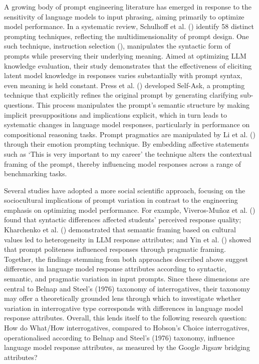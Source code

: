 \documentclass[
  12pt,
]{article}
\begin{document}
A growing body of prompt engineering literature has emerged in response to the sensitivity of language models to input phrasing, aiming primarily to optimize model performance. In a systematic review, Schulhoff et al. () identify 58 distinct prompting techniques, reflecting the multidimensionality of prompt design. One such technique, instruction selection (), manipulates the syntactic form of prompts while preserving their underlying meaning. Aimed at optimizing LLM knowledge evaluation, their study demonstrates that the effectiveness of eliciting latent model knowledge in responses varies substantially with prompt syntax, even meaning is held constant. Press et al. () developed Self-Ask, a prompting technique that explicitly refines the original prompt by generating clarifying sub-questions. This process manipulates the prompt's semantic structure by making implicit presuppositions and implications explicit, which in turn leads to systematic changes in language model responses, particularly in performance on compositional reasoning tasks. Prompt pragmatics are manipulated by Li et al. () through their emotion prompting technique. By embedding affective statements such as `This is very important to my career' the technique alters the contextual framing of the prompt, thereby influencing model responses across a range of benchmarking tasks.

Several studies have adopted a more social scientific approach, focusing on the sociocultural implications of prompt variation in contrast to the engineering emphasis on optimizing model performance. For example, Viveros-Muñoz et al. () found that syntactic differences affected students' perceived response quality; Kharchenko et al. () demonstrated that semantic framing based on cultural values led to heterogeneity in LLM response attributes; and Yin et al. () showed that prompt politeness influenced responses through pragmatic framing. Together, the findings stemming from both approaches described above suggest differences in language model response attributes according to syntactic, semantic, and pragmatic variation in input prompts. Since these dimensions are central to Belnap and Steel's (1976) taxonomy of interrogatives, their taxonomy may offer a theoretically grounded lens through which to investigate whether variation in interrogative type corresponds with differences in language model response attributes. Overall, this lends itself to the following research question:
How do What/How interrogatives, compared to Hobson's Choice interrogatives, operationalised according to Belnap and Steel's (1976) taxonomy, influence language model response attributes, as measured by the Google Jigsaw bridging attributes?
\end{document}
